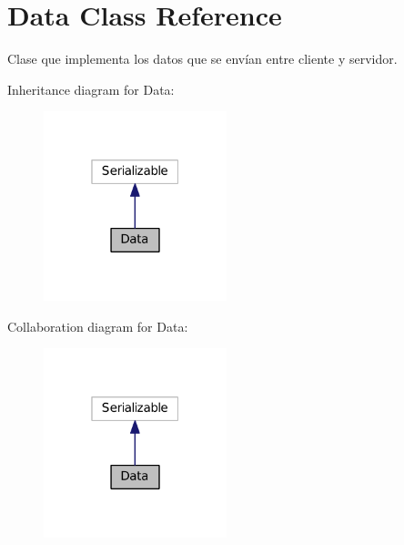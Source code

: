 \hypertarget{class_data}{}\section{Data Class Reference}
\label{class_data}


Clase que implementa los datos que se envían entre cliente y servidor.  




Inheritance diagram for Data\+:
\nopagebreak
\begin{figure}[H]
\begin{center}
\leavevmode
\includegraphics[width=151pt]{class_data__inherit__graph}
\end{center}
\end{figure}


Collaboration diagram for Data\+:
\nopagebreak
\begin{figure}[H]
\begin{center}
\leavevmode
\includegraphics[width=151pt]{class_data__coll__graph}
\end{center}
\end{figure}
